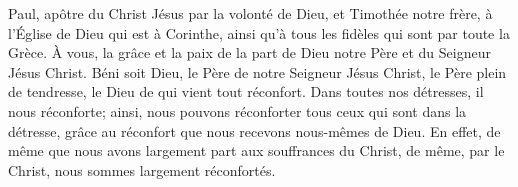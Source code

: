 Paul, apôtre du Christ Jésus par la volonté de Dieu, et Timothée notre frère,
	à l’Église de Dieu qui est à Corinthe,
	ainsi qu’à tous les fidèles qui sont par toute la Grèce.
À vous, la grâce et la paix
		de la part de Dieu notre Père et du Seigneur Jésus Christ.
Béni soit Dieu, le Père de notre Seigneur Jésus Christ,
	le Père plein de tendresse, le Dieu de qui vient tout réconfort.
Dans toutes nos détresses, il nous réconforte;
	ainsi, nous pouvons réconforter tous ceux qui sont dans la détresse,
	grâce au réconfort que nous recevons nous-mêmes de Dieu.
En effet, de même que nous avons largement part aux souffrances du Christ,
	de même, par le Christ, nous sommes largement réconfortés.
